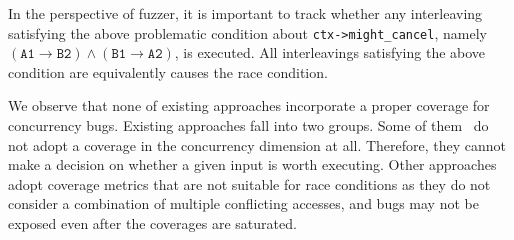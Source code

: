 In the perspective of fuzzer, it is important to track whether any
interleaving satisfying the above problematic condition about
\texttt{ctx->might_cancel}, namely
$(\texttt{A1} \rightarrow \texttt{B2}) \wedge (\texttt{B1} \rightarrow
\texttt{A2})$, is executed. All interleavings satisfying the above
condition are equivalently causes the race condition.








%
We observe that none of existing approaches incorporate a proper
coverage for concurrency bugs.
%
Existing approaches fall into two groups.
%
Some of them~\cite{snowboard, razzer} do not adopt a coverage in the
concurrency dimension at all. Therefore, they cannot make a decision
on whether a given input is worth executing.
%
Other approaches~\cite{krace, muzz} adopt coverage metrics that are
not suitable for race conditions as they do not consider a combination
of multiple conflicting accesses, and bugs may not be exposed even
after the coverages are saturated.
%

